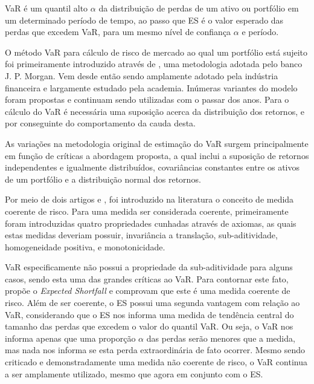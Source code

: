 \documentclass[review]{elsarticle}
\theoremstyle{definition}
\begin{document}
VaR é um quantil alto $\alpha$ da distribuição de perdas de um ativo ou portfólio em um determinado período de tempo, ao passo que ES é o valor esperado das perdas que excedem VaR, para um mesmo nível de confiança $\alpha$ e período.

O método VaR para cálculo de risco de mercado ao qual um portfólio está sujeito foi primeiramente introduzido através de \cite{RiskMetrics1995}, uma metodologia adotada pelo banco J. P. Morgan. Vem desde então sendo amplamente adotado pela indústria financeira e largamente estudado pela academia. Inúmeras variantes do modelo foram propostas e continuam sendo utilizadas com o passar dos anos. Para o cálculo do VaR é necessária uma suposição acerca da distribuição dos retornos, e por conseguinte do comportamento da cauda desta.

As variações na metodologia original de estimação do VaR surgem principalmente em função de críticas a abordagem proposta, a qual inclui a suposição de retornos independentes e igualmente distribuídos, covariâncias constantes entre os ativos de um portfólio e a distribuição normal dos retornos.

Por meio de dois artigos \cite{Artzner1997} e \cite{Artzner1999}, foi introduzido na literatura o conceito de medida coerente de risco. Para uma medida ser considerada coerente, primeiramente foram introduzidas quatro propriedades cunhadas através de axiomas, as quais estas medidas deveriam possuir, invariância a translação,	sub-aditividade, homogeneidade positiva, e monotonicidade.

VaR especificamente não possui a propriedade da sub-aditividade para alguns casos, sendo esta uma das grandes críticas ao VaR. Para contornar este fato, \cite{Acerbi2002} propõe o \emph{Expected Shortfall} e comprovam que este é uma medida coerente de risco. Além de ser coerente, o ES possui uma segunda vantagem com relação ao VaR, considerando que o ES nos informa uma medida de tendência central do tamanho das perdas que excedem o valor do quantil VaR. Ou seja, o VaR nos informa apenas que uma proporção $\alpha$ das perdas serão menores que a medida, mas nada nos informa se esta perda extraordinária de fato ocorrer. Mesmo sendo criticado e demonstradamente uma medida não coerente de risco, o VaR continua a ser amplamente utilizado, mesmo que agora em conjunto com o ES. 

\end{document}
